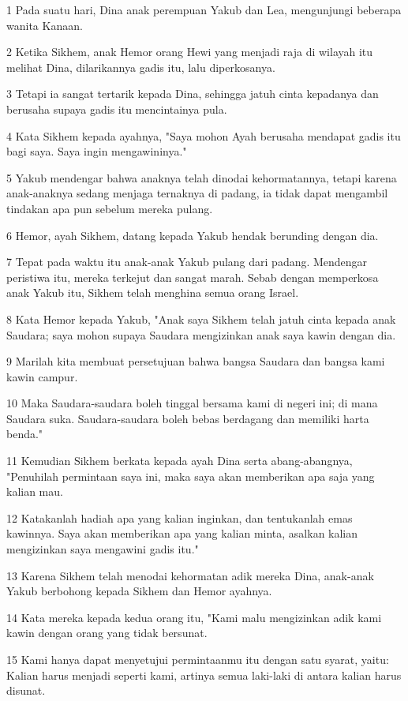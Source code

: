 \par 1 Pada suatu hari, Dina anak perempuan Yakub dan Lea, mengunjungi beberapa wanita Kanaan.
\par 2 Ketika Sikhem, anak Hemor orang Hewi yang menjadi raja di wilayah itu melihat Dina, dilarikannya gadis itu, lalu diperkosanya.
\par 3 Tetapi ia sangat tertarik kepada Dina, sehingga jatuh cinta kepadanya dan berusaha supaya gadis itu mencintainya pula.
\par 4 Kata Sikhem kepada ayahnya, "Saya mohon Ayah berusaha mendapat gadis itu bagi saya. Saya ingin mengawininya."
\par 5 Yakub mendengar bahwa anaknya telah dinodai kehormatannya, tetapi karena anak-anaknya sedang menjaga ternaknya di padang, ia tidak dapat mengambil tindakan apa pun sebelum mereka pulang.
\par 6 Hemor, ayah Sikhem, datang kepada Yakub hendak berunding dengan dia.
\par 7 Tepat pada waktu itu anak-anak Yakub pulang dari padang. Mendengar peristiwa itu, mereka terkejut dan sangat marah. Sebab dengan memperkosa anak Yakub itu, Sikhem telah menghina semua orang Israel.
\par 8 Kata Hemor kepada Yakub, "Anak saya Sikhem telah jatuh cinta kepada anak Saudara; saya mohon supaya Saudara mengizinkan anak saya kawin dengan dia.
\par 9 Marilah kita membuat persetujuan bahwa bangsa Saudara dan bangsa kami kawin campur.
\par 10 Maka Saudara-saudara boleh tinggal bersama kami di negeri ini; di mana Saudara suka. Saudara-saudara boleh bebas berdagang dan memiliki harta benda."
\par 11 Kemudian Sikhem berkata kepada ayah Dina serta abang-abangnya, "Penuhilah permintaan saya ini, maka saya akan memberikan apa saja yang kalian mau.
\par 12 Katakanlah hadiah apa yang kalian inginkan, dan tentukanlah emas kawinnya. Saya akan memberikan apa yang kalian minta, asalkan kalian mengizinkan saya mengawini gadis itu."
\par 13 Karena Sikhem telah menodai kehormatan adik mereka Dina, anak-anak Yakub berbohong kepada Sikhem dan Hemor ayahnya.
\par 14 Kata mereka kepada kedua orang itu, "Kami malu mengizinkan adik kami kawin dengan orang yang tidak bersunat.
\par 15 Kami hanya dapat menyetujui permintaanmu itu dengan satu syarat, yaitu: Kalian harus menjadi seperti kami, artinya semua laki-laki di antara kalian harus disunat.
